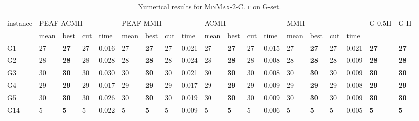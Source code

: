 \documentclass[12pt, a4paper]{article}%
\renewcommand{\arraystretch}{1.3}
\numberwithin{equation}{section}
\theoremstyle{plain}
\begin{document}
			
			{
				\scriptsize
				\setlength{\tabcolsep}{8.5pt}
				\renewcommand{\arraystretch}{1.2}
				\begin{landscape}
					\begin{longtable}{lllllllllllllllllll}
						\caption[Results for \textsc{MinMax}-$2$-\textsc{Cut}]{Numerical results for \textsc{MinMax}-$2$-\textsc{Cut} on G-set.}
						\label{tab::min-max2cut}\\
						\hline
						\multirow{2}{*}{instance} & \multicolumn{4}{l}{PEAF-ACMH}               & \multicolumn{4}{l}{PEAF-MMH}                & \multicolumn{4}{l}{ACMH}                   & \multicolumn{4}{l}{MMH}                    & \multirow{2}{*}{G-0.5H} & \multirow{2}{*}{G-H} \\ \cline{2-17}
						& mean    & best           & cut   & time      & mean    & best           & cut   & time     & mean    & best           & cut   & time      & mean    & best           & cut   & time     &                         &                      \\ \hline
						G1                        & 27   & \textbf{27} & 27  & 0.016 & 27   & \textbf{27} & 27  & 0.021 & 27   & \textbf{27} & 27  & 0.015 & 27   & \textbf{27} & 27  & 0.021 & \textbf{27}             & \textbf{27}          \\
						G2                        & 28   & \textbf{28} & 28  & 0.028 & 28   & \textbf{28} & 28  & 0.024 & 28   & \textbf{28} & 28  & 0.008 & 28   & \textbf{28} & 28  & 0.009 & \textbf{28}             & \textbf{28}          \\
						G3                        & 30   & \textbf{30} & 30  & 0.030 & 30   & \textbf{30} & 30  & 0.021 & 30   & \textbf{30} & 30  & 0.008 & 30   & \textbf{30} & 30  & 0.009 & \textbf{30}             & \textbf{30}          \\
						G4                        & 29   & \textbf{29} & 29  & 0.017 & 29   & \textbf{29} & 29  & 0.017 & 29   & \textbf{29} & 29  & 0.009 & 29   & \textbf{29} & 29  & 0.008 & \textbf{29}             & \textbf{29}          \\
						G5                        & 30   & \textbf{30} & 30  & 0.026 & 30   & \textbf{30} & 30  & 0.019 & 30   & \textbf{30} & 30  & 0.009 & 30   & \textbf{30} & 30  & 0.009 & \textbf{30}             & \textbf{30}          \\
						G14                       & 5    & \textbf{5}  & 5   & 0.022 & 5    & \textbf{5}  & 5   & 0.009 & 5    & \textbf{5}  & 5   & 0.006 & 5    & \textbf{5}  & 5   & 0.005 & \textbf{5}              & \textbf{5}           \\

\end{longtable}
\end{landscape}}
\end{document}
